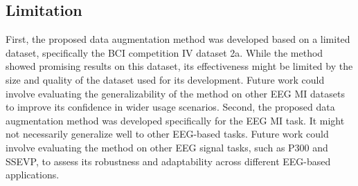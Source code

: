 \subsection{Limitation}
First, the proposed data augmentation method was developed based on a limited dataset, specifically the BCI competition IV dataset 2a. 
While the method showed promising results on this dataset, its effectiveness might be limited by the size and quality of the dataset used for its development. 
Future work could involve evaluating the generalizability of the method on other EEG MI datasets to improve its confidence in wider usage scenarios.
Second, the proposed data augmentation method was developed specifically for the EEG MI task. 
It might not necessarily generalize well to other EEG-based tasks. 
Future work could involve evaluating the method on other EEG signal tasks, such as P300 and SSEVP, to assess its robustness and adaptability across different EEG-based applications.
